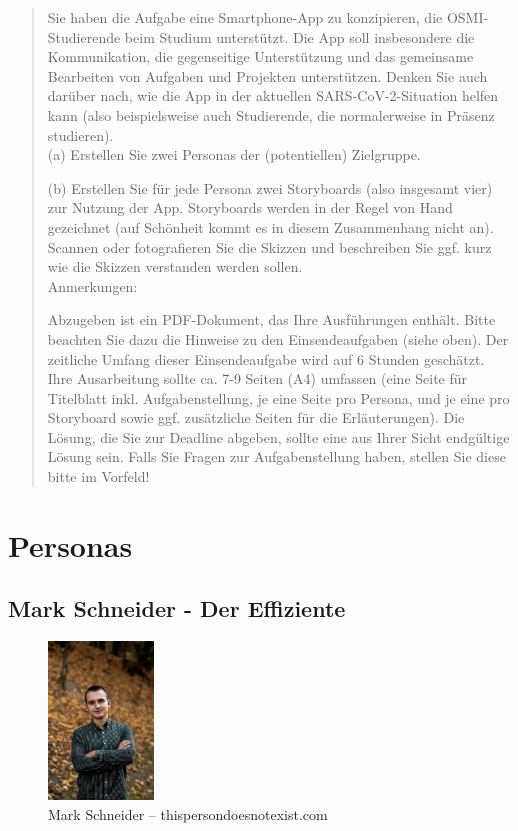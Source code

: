 \documentclass{article}
\begin{document}
\begin{quote}
	Sie haben die Aufgabe eine Smartphone-App zu konzipieren, die OSMI-Studierende beim Studium unterstützt.
	Die App soll insbesondere die Kommunikation, die gegenseitige Unterstützung und das gemeinsame Bearbeiten
	von Aufgaben und Projekten unterstützen. Denken Sie auch darüber nach, wie die App in der aktuellen
	SARS-CoV-2-Situation helfen kann (also beispielsweise auch Studierende, die normalerweise in Präsenz studieren).
	\\[1em]
	(a) Erstellen Sie zwei Personas der (potentiellen) Zielgruppe.

	(b) Erstellen Sie für jede Persona zwei Storyboards (also insgesamt vier) zur Nutzung der App. Storyboards
	werden in der Regel von Hand gezeichnet (auf Schönheit kommt es in diesem Zusammenhang nicht an). Scannen
	oder fotografieren Sie die Skizzen und beschreiben Sie ggf. kurz wie die Skizzen verstanden werden sollen.
	\\[1em]
	Anmerkungen:

	Abzugeben ist ein PDF-Dokument, das Ihre Ausführungen enthält. Bitte beachten Sie dazu die Hinweise zu den
	Einsendeaufgaben (siehe oben). Der zeitliche Umfang dieser Einsendeaufgabe wird auf 6 Stunden geschätzt.
	Ihre Ausarbeitung sollte ca. 7-9 Seiten (A4) umfassen (eine Seite für Titelblatt inkl. Aufgabenstellung,
	je eine Seite pro Persona, und je eine pro Storyboard sowie ggf. zusätzliche Seiten für die Erläuterungen).
	Die Lösung, die Sie zur Deadline abgeben, sollte eine aus Ihrer Sicht endgültige Lösung sein. Falls Sie
	Fragen zur Aufgabenstellung haben, stellen Sie diese bitte im Vorfeld!
\end{quote}

\newpage

\section{Personas}

\subsection{Mark Schneider - Der Effiziente}

\begin{figure}[h]
	\includegraphics[width=0.25\textwidth]{mark}
	\centering
	\caption{Mark Schneider – thispersondoesnotexist.com}
\end{figure}
\end{document}
